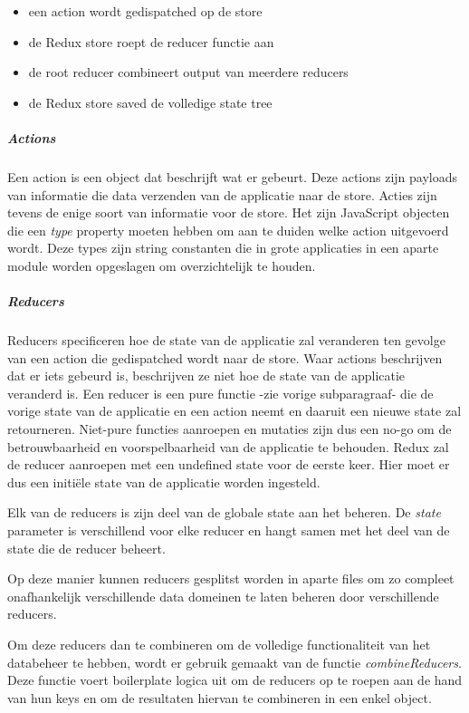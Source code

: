\begin{itemize}
	\item een action wordt gedispatched op de store
	\item de Redux store roept de reducer functie aan
	\item de root reducer combineert output van meerdere reducers
	\item de Redux store saved de volledige state tree
\end{itemize}

\subparagraph{Actions}
Een action is een object dat beschrijft wat er gebeurt.
Deze actions zijn payloads van informatie die data verzenden van de applicatie naar de store. Acties zijn tevens de enige soort van informatie voor de store. Het zijn JavaScript objecten die een \textit{type} property moeten hebben om aan te duiden welke action uitgevoerd wordt. Deze types zijn string constanten die in grote applicaties in een aparte module worden opgeslagen om overzichtelijk te houden. 
\autocite{actions}

\subparagraph{Reducers}
Reducers specificeren hoe de state van de applicatie zal veranderen ten gevolge van een action die gedispatched wordt naar de store. Waar actions beschrijven dat er iets gebeurd is, beschrijven ze niet hoe de state van de applicatie veranderd is. Een reducer is een pure functie -zie vorige subparagraaf- die de vorige state van de applicatie en een action neemt en daaruit een nieuwe state zal retourneren. 
Niet-pure functies aanroepen en mutaties zijn dus een no-go om de betrouwbaarheid en voorspelbaarheid van de applicatie te behouden. Redux zal de reducer aanroepen met een undefined state voor de eerste keer. Hier moet er dus een initiële state van de applicatie worden ingesteld.

Elk van de reducers is zijn deel van de globale state aan het beheren. De \textit{state} parameter is verschillend voor elke reducer en hangt samen met het deel van de state die de reducer beheert.

Op deze manier kunnen reducers gesplitst worden in aparte files om zo compleet onafhankelijk verschillende data domeinen te laten beheren door verschillende reducers. 

Om deze reducers dan te combineren om de volledige functionaliteit van het databeheer te hebben, wordt er gebruik gemaakt van de functie \textit{combineReducers}. Deze functie voert boilerplate logica uit om de reducers op te roepen aan de hand van hun keys en om de resultaten hiervan te combineren in een enkel object. 
\autocite{reducers}

